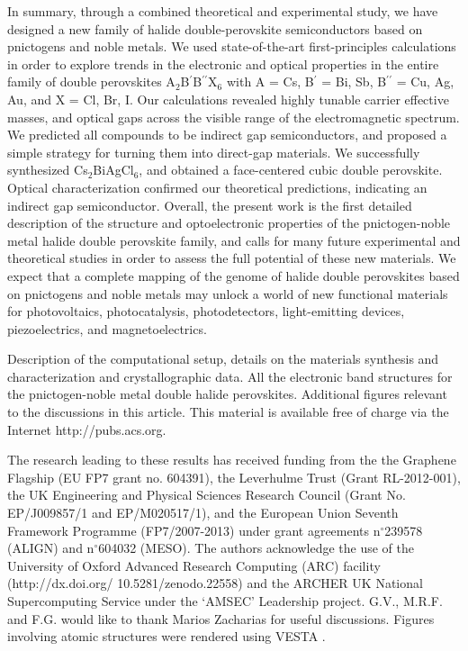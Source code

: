 \documentclass[journal=jpcl,manuscript=letter,layout=traditional]{achemso}
\begin{document}
In summary, through a combined theoretical and experimental study, we have designed a new family of halide double-perovskite semiconductors based on pnictogens and noble metals. We used state-of-the-art first-principles calculations in order to explore trends in the electronic and optical properties in the entire family of double perovskites A$_2$B$^\prime$B$^{\prime\prime}$X$_6$ with A = Cs, B$^\prime$ = Bi, Sb, B$^{\prime\prime}$ = Cu, Ag, Au, and X = Cl, Br, I. Our calculations revealed highly tunable carrier effective masses, and optical gaps across the visible range of the electromagnetic spectrum. We predicted all compounds to be indirect gap semiconductors, and proposed a simple strategy for turning them into direct-gap materials. We successfully synthesized Cs$_2$BiAgCl$_6$, and obtained a face-centered cubic double perovskite. Optical characterization confirmed our theoretical predictions, indicating an indirect gap semiconductor. Overall, the present work is the first detailed description of the structure and optoelectronic properties of the pnictogen-noble metal halide double perovskite family, and calls for many future experimental and theoretical studies in order to assess the full potential of these new materials. We expect that a complete mapping of the genome of halide double perovskites based on pnictogens and noble metals may unlock a world of new functional materials for photovoltaics, photocatalysis, photodetectors, light-emitting devices, piezoelectrics, and magnetoelectrics.

\vspace{0.6cm}

 Description of the computational setup, details on the materials synthesis and characterization and crystallographic data. All the electronic band structures for the pnictogen-noble metal double halide perovskites. Additional figures relevant to the discussions in this article. This material is available free of charge via the Internet http://pubs.acs.org.

\begin{acknowledgement}
The research leading to these results has received funding from the the Graphene Flagship
(EU FP7 grant no. 604391), the Leverhulme Trust (Grant RL-2012-001), the UK Engineering and Physical
Sciences Research Council (Grant No. EP/J009857/1 and EP/M020517/1), and the European Union Seventh Framework
Programme (FP7/2007-2013) under grant agreements n$^\circ$239578 (ALIGN) and n$^\circ$604032 (MESO).
The authors acknowledge the use of the University of Oxford Advanced
Research Computing (ARC) facility (http://dx.doi.org/
10.5281/zenodo.22558) and the ARCHER UK National
Supercomputing Service under the `AMSEC' Leadership project. G.V., M.R.F. and F.G. would like to thank Marios
Zacharias for useful discussions. Figures involving atomic structures were rendered using VESTA \cite{VESTA}.
\end{acknowledgement}
\end{document}
